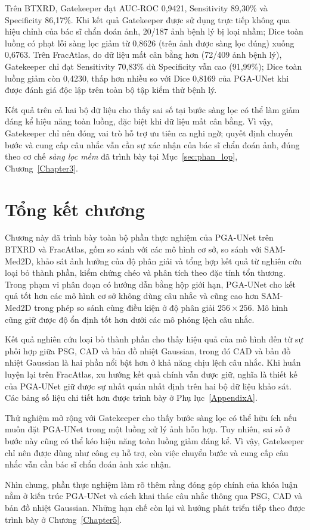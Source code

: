 Trên BTXRD, Gatekeeper đạt AUC-ROC 0,9421, Sensitivity 89,30\% và Specificity 86,17\%. Khi kết quả Gatekeeper được sử dụng trực tiếp không qua hiệu chỉnh của bác sĩ chẩn đoán ảnh, 20/187 ảnh bệnh lý bị loại nhầm; Dice toàn luồng có phạt lỗi sàng lọc giảm từ 0,8626 (trên ảnh được sàng lọc đúng) xuống 0,6763. Trên FracAtlas, do dữ liệu mất cân bằng hơn (72/409 ảnh bệnh lý), Gatekeeper chỉ đạt Sensitivity 70,83\% dù Specificity vẫn cao (91,99\%); Dice toàn luồng giảm còn 0,4230, thấp hơn nhiều so với Dice 0,8169 của PGA-UNet khi được đánh giá độc lập trên toàn bộ tập kiểm thử bệnh lý.

Kết quả trên cả hai bộ dữ liệu cho thấy sai số tại bước sàng lọc có thể làm giảm đáng kể hiệu năng toàn luồng, đặc biệt khi dữ liệu mất cân bằng. Vì vậy, Gatekeeper chỉ nên đóng vai trò hỗ trợ ưu tiên ca nghi ngờ; quyết định chuyển bước và cung cấp câu nhắc vẫn cần sự xác nhận của bác sĩ chẩn đoán ảnh, đúng theo cơ chế \textit{sàng lọc mềm} đã trình bày tại Mục~\ref{sec:phan_lop}, Chương~\ref{Chapter3}.
\section{Tổng kết chương}
\label{sec:summary_ch4}

Chương này đã trình bày toàn bộ phần thực nghiệm của PGA-UNet trên BTXRD và FracAtlas, gồm so sánh với các mô hình cơ sở, so sánh với SAM-Med2D, khảo sát ảnh hưởng của độ phân giải và tổng hợp kết quả từ nghiên cứu loại bỏ thành phần, kiểm chứng chéo và phân tích theo đặc tính tổn thương. Trong phạm vi phân đoạn có hướng dẫn bằng hộp giới hạn, PGA-UNet cho kết quả tốt hơn các mô hình cơ sở không dùng câu nhắc và cũng cao hơn SAM-Med2D trong phép so sánh cùng điều kiện ở độ phân giải $256\times256$. Mô hình cũng giữ được độ ổn định tốt hơn dưới các mô phỏng lệch câu nhắc.

Kết quả nghiên cứu loại bỏ thành phần cho thấy hiệu quả của mô hình đến từ sự phối hợp giữa PSG, CAD và bản đồ nhiệt Gaussian, trong đó CAD và bản đồ nhiệt Gaussian là hai phần nổi bật hơn ở khả năng chịu lệch câu nhắc. Khi huấn luyện lại trên FracAtlas, xu hướng kết quả chính vẫn được giữ, nghĩa là thiết kế của PGA-UNet giữ được sự nhất quán nhất định trên hai bộ dữ liệu khảo sát. Các bảng số liệu chi tiết hơn được trình bày ở Phụ lục~\ref{AppendixA}.

Thử nghiệm mở rộng với Gatekeeper cho thấy bước sàng lọc có thể hữu ích nếu muốn đặt PGA-UNet trong một luồng xử lý ảnh hỗn hợp. Tuy nhiên, sai số ở bước này cũng có thể kéo hiệu năng toàn luồng giảm đáng kể. Vì vậy, Gatekeeper chỉ nên được dùng như công cụ hỗ trợ, còn việc chuyển bước và cung cấp câu nhắc vẫn cần bác sĩ chẩn đoán ảnh xác nhận.

Nhìn chung, phần thực nghiệm làm rõ thêm rằng đóng góp chính của khóa luận nằm ở kiến trúc PGA-UNet và cách khai thác câu nhắc thông qua PSG, CAD và bản đồ nhiệt Gaussian. Những hạn chế còn lại và hướng phát triển tiếp theo được trình bày ở Chương~\ref{Chapter5}.
